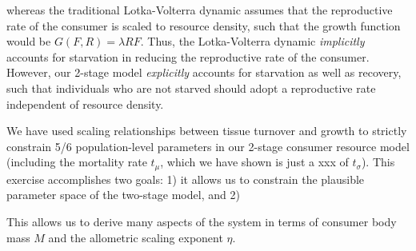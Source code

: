 \documentclass[12pt,english]{article}
\begin{document}
\begin{spacing}{1.9}
 whereas the traditional Lotka-Volterra dynamic assumes that the reproductive rate of the consumer is scaled to resource density, such that the growth function would be $G(F,R) = \lambda R F$.
Thus, the Lotka-Volterra dynamic \emph{implicitly} accounts for starvation in reducing the reproductive rate of the consumer.
However, our 2-stage model \emph{explicitly} accounts for starvation as well as recovery, such that individuals who are not starved should adopt a reproductive rate independent of resource density.



We have used scaling relationships between tissue turnover and growth to strictly constrain 5/6 population-level parameters in our 2-stage consumer resource model (including the mortality rate $t_\mu$, which we have shown is just a xxx of $t_\sigma$).
This exercise accomplishes two goals:
1) it allows us to constrain the plausible parameter space of the two-stage model, and 
2) 

This allows us to derive many aspects of the system in terms of consumer body mass $M$ and the allometric scaling exponent $\eta$.



 \\ \nonumber






%
%




\end{spacing}
\end{document}
